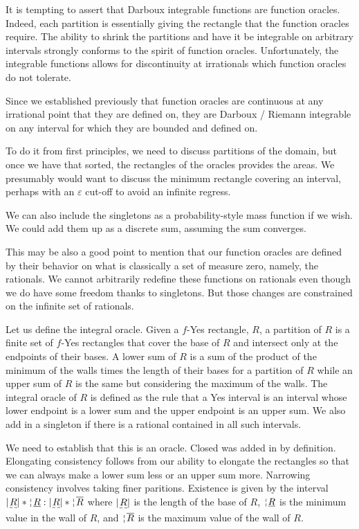 \documentclass[12pt]{article}
\theoremstyle{remark}
\begin{document}
It is tempting to assert that Darboux integrable functions are function oracles. Indeed, each partition is essentially giving the rectangle that the function oracles require. The ability to shrink the partitions and have it be integrable on arbitrary intervals strongly conforms to the spirit of function oracles. Unfortunately, the integrable functions allows for discontinuity at irrationals which function oracles do not tolerate. 

Since we established previously that function oracles are continuous at any irrational point that they are defined on, they are Darboux / Riemann integrable on any interval for which they are bounded and defined on. 

To do it from first principles, we need to discuss partitions of the domain, but once we have that sorted, the rectangles of the oracles provides the areas. We presumably would want to discuss the minimum rectangle covering an interval, perhaps with an $\varepsilon$ cut-off to avoid an infinite regress. 

We can also include the singletons as a probability-style mass function if we wish. We could add them up as a discrete sum, assuming the sum converges. 

This may be also a good point to mention that our function oracles are defined by their behavior on what is classically a set of measure zero, namely, the rationals. We cannot arbitrarily redefine these functions on rationals even though we do have some freedom thanks to singletons. But those changes are constrained on the infinite set of rationals. 

Let us define the integral oracle. Given a $f$-Yes rectangle, $R$, a partition of $R$ is a finite set of $f$-Yes rectangles that cover the base of $R$ and intersect only at the endpoints of their bases. A lower sum of $R$ is a sum of the product of the minimum of the walls times the length of their bases for a partition of $R$ while an upper sum of $R$ is the same but considering the maximum of the walls. The integral oracle of $R$ is defined as the rule that a Yes interval is an interval whose lower endpoint is a lower sum and the upper endpoint is an upper sum. We also add in a singleton if there is a rational contained in all such intervals. 

We need to establish that this is an oracle. Closed was added in by definition. Elongating consistency follows from our ability to elongate the rectangles so that we can always make a lower sum less or an upper sum more. Narrowing consistency involves taking finer paritions. Existence is given by the interval $|\base{R}|*\wall{\underline{R}}: |\base{R}|*\wall{\overline{R}}$ where $|\base{R}|$ is the length of the base of $R$, $\wall{\underline{R}}$ is the minimum value in the wall of $R$, and $\wall{\overline{R}}$ is the maximum value of the wall of $R$. 
\end{document}
